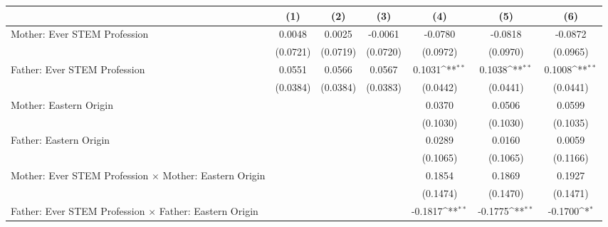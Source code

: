 {
\def\sym#1{\ifmmode^{#1}\else\(^{#1}\)\fi}
\begin{tabular}{l*{6}{c}}
\toprule
                    &\multicolumn{1}{c}{(1)}         &\multicolumn{1}{c}{(2)}         &\multicolumn{1}{c}{(3)}         &\multicolumn{1}{c}{(4)}         &\multicolumn{1}{c}{(5)}         &\multicolumn{1}{c}{(6)}         \\
\midrule
Mother: Ever STEM Profession&      0.0048         &      0.0025         &     -0.0061         &     -0.0780         &     -0.0818         &     -0.0872         \\
                    &    (0.0721)         &    (0.0719)         &    (0.0720)         &    (0.0972)         &    (0.0970)         &    (0.0965)         \\
\addlinespace
Father: Ever STEM Profession&      0.0551         &      0.0566         &      0.0567         &      0.1031\sym{**} &      0.1038\sym{**} &      0.1008\sym{**} \\
                    &    (0.0384)         &    (0.0384)         &    (0.0383)         &    (0.0442)         &    (0.0441)         &    (0.0441)         \\
\addlinespace
Mother: Eastern Origin&                     &                     &                     &      0.0370         &      0.0506         &      0.0599         \\
                    &                     &                     &                     &    (0.1030)         &    (0.1030)         &    (0.1035)         \\
\addlinespace
Father: Eastern Origin&                     &                     &                     &      0.0289         &      0.0160         &      0.0059         \\
                    &                     &                     &                     &    (0.1065)         &    (0.1065)         &    (0.1166)         \\
\addlinespace
Mother: Ever STEM Profession $\times$ Mother: Eastern Origin&                     &                     &                     &      0.1854         &      0.1869         &      0.1927         \\
                    &                     &                     &                     &    (0.1474)         &    (0.1470)         &    (0.1471)         \\
\addlinespace
Father: Ever STEM Profession $\times$ Father: Eastern Origin&                     &                     &                     &     -0.1817\sym{**} &     -0.1775\sym{**} &     -0.1700\sym{*}  \\

\end{tabular}}
